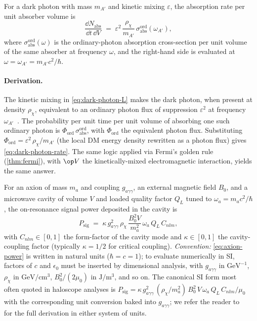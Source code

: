 \begin{statement}
\label{stmt:dark-photon-rate}
For a dark photon with mass $m_{A'}$ and kinetic mixing $\varepsilon$,
the absorption rate per unit absorber volume is
\begin{equation}
\label{eq:dark-photon-rate}
\frac{\dd N_\text{abs}}{\dd t \,\dd V} \;=\; \varepsilon^2\,\frac{\rho_\chi}{m_{A'}}\,
\sigma_\text{abs}^\text{ord}(\omega_{A'}),
\end{equation}
where $\sigma_\text{abs}^\text{ord}(\omega)$ is the ordinary-photon
absorption cross-section per unit volume of the same absorber at
frequency $\omega$, and the right-hand side is evaluated at
$\omega=\omega_{A'}=m_{A'}c^2/\hbar$.
\end{statement}

\paragraph{Derivation.}
The kinetic mixing in \cref{eq:dark-photon-L} makes the dark
photon, when present at density $\rho_\chi$, equivalent to an
ordinary photon flux of suppression $\varepsilon^2$ at frequency
$\omega_{A'}$~\cite{caputo2021review}. The probability per unit
time per unit volume of absorbing one such ordinary photon is
$\Phi_\text{ord}\,\sigma_\text{abs}^\text{ord}$, with $\Phi_\text{ord}$
the equivalent photon flux. Substituting
$\Phi_\text{ord}=\varepsilon^2\,\rho_\chi/m_{A'}$ (the local DM
energy density rewritten as a photon flux) gives
\cref{eq:dark-photon-rate}. The same logic applied via Fermi's
golden rule (\cref{thm:fermi}), with $\op V$ the kinetically-mixed
electromagnetic interaction, yields the same answer.

\begin{statement}
\label{stmt:axion-power}
For an axion of mass $m_a$ and coupling $g_{a\gamma\gamma}$, an
external magnetic field $B_0$, and a microwave cavity of volume
$V$ and loaded quality factor $Q_L$ tuned to $\omega_a=m_a c^2/\hbar$,
the on-resonance signal power deposited in the cavity is
\begin{equation}
\label{eq:axion-power}
P_\text{sig} \;=\; \kappa\,g_{a\gamma\gamma}^2\,\rho_\chi\,
\frac{B_0^2 V}{m_a^2}\,\omega_a\,Q_L\,C_{nlm},
\end{equation}
with $C_{nlm}\in[0,1]$ the form-factor of the cavity mode and
$\kappa\in[0,1]$ the cavity-coupling factor (typically $\kappa=1/2$
for critical coupling). \emph{Convention:} \cref{eq:axion-power}
is written in natural units ($\hbar=c=1$); to evaluate
numerically in SI, factors of $c$ and $\epsilon_0$ must be
inserted by dimensional analysis, with $g_{a\gamma\gamma}$ in
$\text{GeV}^{-1}$, $\rho_\chi$ in $\text{GeV}/\text{cm}^3$,
$B_0^2/(2\mu_0)$ in $\text{J}/\text{m}^3$, and so on. The
canonical SI form most often quoted in haloscope analyses is
$P_\text{sig}=\kappa\,g_{a\gamma\gamma}^2\,(\rho_\chi/m_a^2)\,
B_0^2\,V\,\omega_a\,Q_L\,C_{nlm}/\mu_0$ with the corresponding
unit conversion baked into $g_{a\gamma\gamma}$; we refer the
reader to~\cite{sikivie1983,caputo2021review} for the full
derivation in either system of units.
\end{statement}

